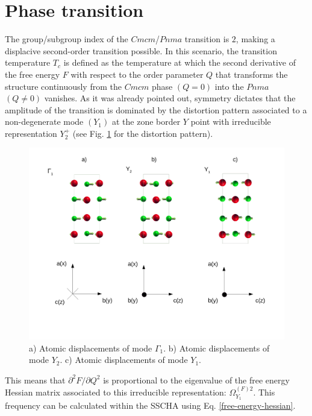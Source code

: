 \section{Phase transition}

The group/subgroup index of the $Cmcm$/$Pnma$ transition is $2$, making a displacive second-order transition possible\cite{toledano1987landau}. In this scenario, the transition temperature $T_{c}$ is defined as the temperature 
at which the second derivative of the free energy $F$ with respect to the order parameter $Q$ that transforms the structure continuously from the $Cmcm$ phase $(Q=0)$ into the $Pnma$ $(Q\ne0)$ vanishes. As it was already 
pointed out\cite{chattopadhyay1986neutron}, symmetry\cite{orobengoa2009amplimodes,perez2010mode} dictates that the amplitude of the transition is dominated by the distortion pattern associated to a non-degenerate mode $(Y_{1})$
at the zone border $Y$ point with irreducible representation $Y_{2}^{+}$ (see Fig. \ref{patterns} for the distortion pattern).
\begin{figure}[h]
\begin{center}
\includegraphics[width=0.8\linewidth]{Figures/normal-modes.pdf}
\caption[Phonon eigenvector patterns.]{a) Atomic displacements of mode $\Gamma_{1}$. b) Atomic displacements of mode $Y_{2}$. c) Atomic displacements of mode $Y_{1}$.}
\label{patterns}
\end{center}
\end{figure}
This means that $\partial^{2}F/\partial Q^{2}$ is proportional to the eigenvalue of the free energy Hessian matrix associated to this irreducible representation: $\Omega^{(F)2}_{Y_{1}}$. This frequency can be calculated within the 
SSCHA using Eq. \ref{free-energy-hessian}. \\

